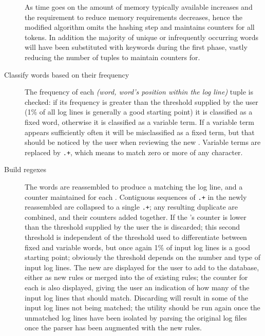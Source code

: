 \begin{description}
        As time goes on the amount of memory typically available increases
        and the requirement to reduce memory requirements decreases, hence
        the modified algorithm omits the hashing step and maintains
        counters for all tokens. In addition the majority of unique or
        infrequently occurring words will have been substituted with
        keywords during the first phase, vastly reducing the number of
        tuples to maintain counters for.

    \item [Classify words based on their frequency]  The frequency of each
        \textit{(word, word's position within the log line)\/} tuple is
        checked: if its frequency is greater than the threshold supplied by
        the user (1\% of all log lines is generally a good starting point)
        it is classified as a fixed word, otherwise it is classified as a
        variable term.  If a variable term appears sufficiently often it
        will be misclassified as a fixed term, but that should be noticed
        by the user when reviewing the new \regexes{}.  Variable terms are
        replaced by \texttt{.+}, which means to match zero or more of any
        character.  

    \item [Build regexes]  The words are reassembled to produce a \regex{}
        matching the log line, and a counter maintained for each \regex{}.
        Contiguous sequences of \texttt{.+} in the newly reassembled
        \regexes{} are collapsed to a single \texttt{.+}; any resulting
        duplicate \regexes{} are combined, and their counters added
        together.  If the \regex{}'s counter is lower than the threshold
        supplied by the user the \regex{} is discarded; this second
        threshold is independent of the threshold used to differentiate
        between fixed and variable words, but once again 1\% of input log
        lines is a good starting point; obviously the threshold depends on
        the number and type of input log lines.  The new \regexes{} are
        displayed for the user to add to the database, either as new rules
        or merged into the \regexes{} of existing rules; the counter for
        each \regex{} is also displayed, giving the user an indication of
        how many of the input log lines that \regex{} should match.
        Discarding \regexes{} will result in some of the input log lines
        not being matched; the utility should be run again once the
        unmatched log lines have been isolated by parsing the original log
        files once the parser has been augmented with the new rules.

\end{description}

